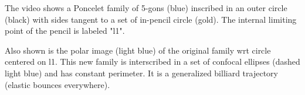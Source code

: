 The video shows a Poncelet family of 5-gons (blue) inscribed in an outer circle (black) with sides tangent to a set of in-pencil circle (gold). The internal limiting point of the pencil is labeled "l1".

Also shown is the polar image (light blue) of the original family wrt circle centered on l1. This new family is interscribed in a set of confocal ellipses (dashed light blue) and has constant perimeter. It is a generalized billiard trajectory (elastic bounces everywhere).